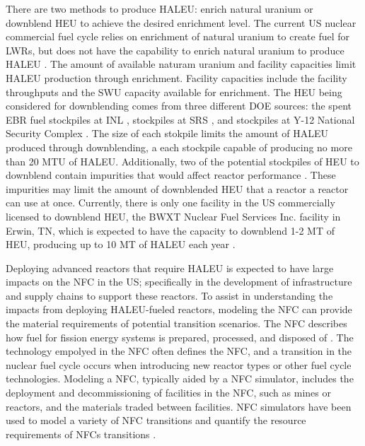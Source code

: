 There are two methods to produce \gls{HALEU}: enrich natural uranium 
or downblend \gls{HEU} to achieve the desired enrichment level. The current US
nuclear commercial fuel cycle relies on enrichment of natural uranium 
to create fuel for \glspl{LWR}, but does not have the capability to enrich
natural uranium to produce \gls{HALEU} \cite{hussain_nei_2018}.  
The amount of available naturam uranium and facility capacities limit 
\gls{HALEU} production through enrichment. Facility 
capacities include the facility throughputs and the \gls{SWU} capacity 
available for enrichment. 
The \gls{HEU} being considered for downblending comes from three different 
\gls{DOE} sources: the spent \gls{EBR} fuel stockpiles at \gls{INL} 
\cite{patterson_haleu_2019}, stockpiles at \gls{SRS} \cite{regalbuto_addressing_2020}, 
and stockpiles at Y-12 National Security Complex 
\cite{robinson_establishment_2020}. The size of each stokpile limits the amount 
of \gls{HALEU} produced through downblending, a each stockpile capable of 
producing no more than 20 MTU of \gls{HALEU}. Additionally, two 
of the potential stockpiles of \gls{HEU} to downblend  
contain impurities that would affect reactor performance 
\cite{vaden_isotopic_2018,nelson_foreign_2010}.
These impurities may limit the amount of downblended \gls{HEU} that a reactor 
a reactor can use at once. 
Currently, there is only one facility in the US commercially licensed to 
downblend \gls{HEU}, the BWXT Nuclear Fuel Services Inc. facility in 
Erwin, TN, which is expected to have the capacity to downblend 1-2 
MT of \gls{HEU}, producing up to 10 MT of \gls{HALEU} each year \cite{nagley_ha-leu_2020}.

Deploying advanced reactors that require \gls{HALEU} is expected to have 
large impacts on the \gls{NFC} in the US; specifically in the development 
of infrastructure and supply chains to support these reactors. To assist 
in understanding the impacts 
from deploying \gls{HALEU}-fueled reactors, modeling the \gls{NFC} 
can provide the material requirements of potential transition scenarios. 
The \gls{NFC} describes how fuel for fission energy systems is 
prepared, processed, and disposed of \cite{tsoulfanidis_nuclear_2013}. 
The technology empolyed in the \gls{NFC} often defines the \gls{NFC}, 
and a transition in the nuclear fuel cycle occurs when 
introducing new reactor types or other fuel cycle technologies.  
Modeling  a \gls{NFC}, typically aided by a \gls{NFC} simulator, 
includes the deployment and decommissioning of facilities in the \gls{NFC}, 
such as mines or reactors, and the materials traded between facilities. 
\gls{NFC} simulators have been used to model a variety of \gls{NFC} 
transitions \cite{sunny_transition_2015,bae_fuel_2018,piet_dynamic_2011} 
and quantify the resource requirements of \glspl{NFC} transitions
\cite{bachmann_enrichment_2021}. 

